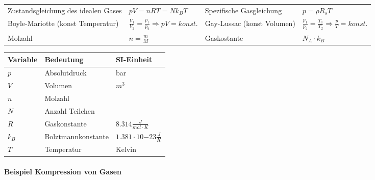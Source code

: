 \documentclass[
a4paper,
oneside,
landscape, 
8pt,
]{scrartcl}
\begin{document}
\begin{multicols*}{2}
\begin{tabbing}
	\begin{tabu} to \linewidth {X l X l}
		\toprule
		Zustandsgleichung des idealen Gases & $pV = nRT = Nk_BT$  &
		Spezifische Gasgleichung & $p = \rho R_s T$ \\
		Boyle-Mariotte (konst Temperatur) & $\frac{V_1}{V_2} = \frac{p_{1}}{p_{2}} \Rightarrow pV = konst.$ &
		Gay-Lussac (konst Volumen) & $\frac{p_1}{p_2} = \frac{T_1}{T_2} \Rightarrow \frac{p}{T} = konst. $ \\
		Molzahl & $n = \frac{m}{M}$ &
		Gaskostante & $N_A \cdot k_B$\\
	\end{tabu}
\end{tabbing}
\begin{tabbing}
	\begin{tabu} to \linewidth {l X l}
		Variable & Bedeutung & SI-Einheit \\
		\midrule
		$p$ & Absolutdruck & bar  \\
		$V$ & Volumen & $m^3$  \\
		$n$ & Molzahl &  \\
		$N$ & Anzahl Teilchen &  \\
		$R$ & Gaskonstante & $8.314 \frac{J}{mol \cdot K}$  \\
		$k_B$ & Bolztmannkonstante & $1.381 \cdot 10{-23} \frac{J}{K}$ \\
		$T$ & Temperatur & Kelvin \\
		\bottomrule
	\end{tabu}
\end{tabbing}

\paragraph{Beispiel Kompression von Gasen} \hfill \\


\end{multicols*}
\end{document}
